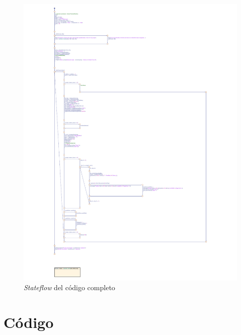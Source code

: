 \documentclass[11pt]{memoir}
\begin{document}
\begin{figure}[H]
\centering
\includegraphics[scale=0.8]{img/source.pdf}
\caption{\textit{Stateflow} del código completo}\label{fig:codigo}
\end{figure}
   

\newpage
\section{Código}
\end{document}
